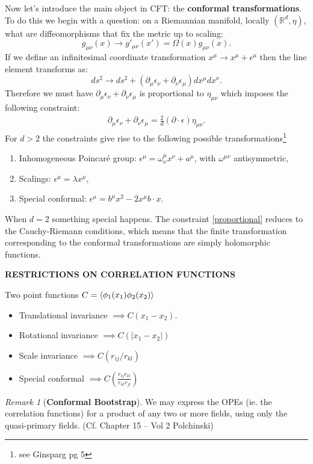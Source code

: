 \documentclass{report}
\theoremstyle{plain}
\theoremstyle{definition}
\theoremstyle{remark}
\newtheorem*{remark}{Remark}
\newcommand{\FR}[2]{\frac{#1}{#2}}
\newcommand{\di}{\partial}
\newcommand{\colr}[1]{ {\color{red} #1 } }
\newcommand{\bR}{\mathbb{R}}
\begin{document}
Now let's introduce the main object in CFT: the \textbf{conformal
transformations}. To do this we begin with a question: on a Riemannian
manifold, locally $(\bR^d,\eta)$, what are diffeomorphisms that fix the
metric up to scaling:
\[ g_{\mu\nu}(x) \to g'_{\mu\nu}(x') = \Omega(x)g_{\mu\nu}(x). \]
If we define an infinitesimal coordinate transformation $x^\mu \to
x^\mu+\epsilon^\mu$ then the line element transforms as:
\[ds^2\to ds^2+(\di_\mu\epsilon_\nu+\di_\nu\epsilon_\mu)dx^\mu dx^\nu.\]
Therefore we must have $\di_\mu\epsilon_\nu+\di_\nu\epsilon_\mu$ is
proportional to $\eta_{\mu\nu}$ which imposes the following constraint:
\begin{align}
\di_\mu\epsilon_\nu + \di_\nu\epsilon_\mu = \FR{2}{d}(\di\cdot
\epsilon)\eta_{\mu\nu}.
    \label{proportional}
\end{align}
For $d>2$ the constraints give rise to the following possible
transformations\footnote{see Ginsparg pg 5}
\begin{enumerate}
    \item Inhomogeneous Poincar\'e group: $\epsilon^\mu = \omega^\mu_\nu
        x^\nu + a^\mu$, with $\omega^{\mu\nu}$ antisymmetric,
    \item Scalings: $\epsilon^\mu = \lambda x^\mu$,
    \item Special conformal: $\epsilon^\mu = b^\mu x^2 - 2x^\mu b\cdot x$.
\end{enumerate}
When $d=2$ something special happens. The constraint \eqref{proportional}
reduces to the Cauchy-Riemann conditions, which means that the finite
transformation corresponding to the conformal transformations are simply
holomorphic functions. 

\colr{\textbf{RESTRICTIONS ON CORRELATION FUNCTIONS}}

Two point functions $C = \braket{\phi_1(x_1)\phi_2(x_2)}$
\begin{itemize}
    \item Translational invariance $\implies C(x_1-x_2)$.
    \item Rotational invariance $\implies C(|x_1-x_2|)$
    \item Scale invariance $\implies C(r_{ij}/r_{kl})$
    \item Special conformal $\implies C(\FR{r_{ij}r_{kl}}{r_{ik}r_{jl}})$
\end{itemize}

\begin{remark}[\textbf{Conformal Bootstrap}] 
    We may express the OPEs (ie. the correlation functions) for a product
    of any two or more fields, using only the quasi-primary fields. (Cf.
    Chapter 15 -- Vol 2 Polchinski)
\end{remark}
\end{document}
